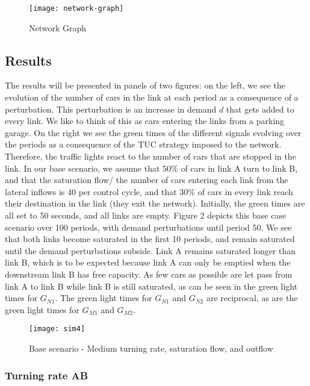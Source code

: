 \documentclass[11pt]{article}
\begin{document}
\begin{figure}[h!]
    \caption{Network Graph}
      \centering
	\texttt{[image: network-graph]}
\end{figure}

\subsection{Results}

The results will be presented in panels of two figures: on the left, we see the evolution of the number of cars in the link at each period as a consequence of a perturbation. This perturbation is an increase in demand $d$ that gets added to every link. We like to think of this as cars entering the links from a parking garage. 
On the right we see the green times of the different signals evolving over the periods as a consequence of the TUC strategy imposed to the network. Therefore, the traffic lights react to the number of cars that are stopped in the link. In our base scenario, we assume that 50\% of cars in link A turn to link B, and that the saturation flow/ the number of cars entering each link from the lateral inflows is 40 per control cycle, and that 30\% of cars in every link reach their destination in the link (they exit the network). Initially, the green times are all set to 50 seconds, and all links are empty. Figure 2 depicts this base case scenario over 100 periods, with demand perturbations until period 50. We see that both links become saturated in the first 10 periods, and remain saturated until the demand perturbations subside. Link A remains saturated longer than link B, which is to be expected because link A can only be emptied when the downstream link B has free capacity. As few cars as possible are let pass from link A to link B while link B is still saturated, as can be seen in the green light times for $G_{N1}$. The green light times for  $G_{N1}$ and  $G_{N2}$ are reciprocal, as are the green light times for $G_{M1}$ and  $G_{M2}$. 

\begin{figure}[h!]
    \caption{Base scenario - Medium turning rate, saturation flow, and outflow}
      \centering
	\texttt{[image: sim4]}
\end{figure}

\subsubsection{Turning rate AB}
\end{document}

